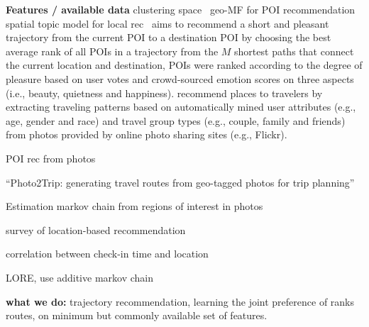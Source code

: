 {\bf Features / available data}
clustering space~\cite{hu2013spatialtopic}
geo-MF for POI recommendation~\cite{lian2014geomf}
spatial topic model for local rec~\cite{hu2013spatialtopic}
\cite{ht14} aims to recommend a short and pleasant trajectory from the current POI to a destination POI by choosing the best average rank 
of all POIs in a trajectory from the $M$ shortest paths that connect the current location and destination,
POIs were ranked according to the degree of pleasure based on user votes and  crowd-sourced emotion scores on three aspects 
(i.e., beauty, quietness and happiness).
\cite{travel13} recommend places to travelers by extracting traveling patterns based on automatically mined user attributes 
(e.g., age, gender and race) and travel group types (e.g., couple, family and friends) from photos provided by online photo 
sharing sites (e.g., Flickr).

POI rec from photos~\cite{shi2011personalized}

``Photo2Trip: generating travel routes from geo-tagged photos for trip planning''~\cite{lu2010photo2trip}

Estimation markov chain from regions of interest in photos~\cite{zheng2012patterns}

survey of location-based recommendation~\cite{bao2015recommendations}

correlation between check-in time and location~\cite{gao2013temporal}

LORE, use additive markov chain\cite{zhang2014lore}

{\bf what we do:}
trajectory recommendation, learning the joint preference of ranks routes, on minimum but commonly available set of features. 


